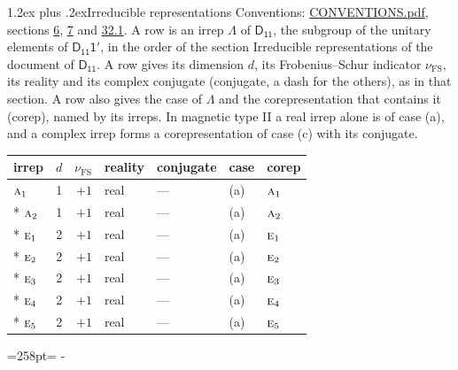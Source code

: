 \documentclass[10pt,a4paper]{article}
\makeatletter
\renewcommand\section{\@startsection{section}{1}{\z@}{-3ex plus -1ex minus -.2ex}%
  {1.2ex plus .2ex}{\normalfont\large\sffamily\bfseries\color{parttitle}}}
\newcommand{\needspace}[1]{\par\penalty-100\begingroup\dimen0=#1\relax\dimen2=\pagegoal
  \advance\dimen2-\pagetotal\ifdim\dimen0>\dimen2\relax\ifdim\dimen2>0pt\vfil\break\fi\fi
  \endgroup}
\numberwithin{equation}{section}
\newcommand{\grp}[1]{\mathsf{#1}}
\newcommand{\irr}[1]{\text{\normalfont\scshape #1}}
\newcommand{\fsind}{\nu_{\mathrm{FS}}}
\makeatother
\begin{document}
\section{Irreducible representations}\label{s:irreps}
Conventions: \href{../../CONVENTIONS.pdf}{CONVENTIONS.pdf}, sections \href{../../../rotation/CONVENTIONS.pdf\#conv.6}{6}, \href{../../../rotation/CONVENTIONS.pdf\#conv.7}{7} and \href{../../CONVENTIONS.pdf\#conv.32.1}{32.1}.
\leavevmode\label{n:irrep.Delta}A row is an irrep $\Lambda$ of $\grp{D_{11}}$, the subgroup of the unitary elements of $\grp{D_{11}1'}$, in the order of the section Irreducible representations of the document of \href{../../../rotation/data/pdf/D11.pdf}{$\grp{D_{11}}$}. \label{n:index.dimension}\label{n:index.frobenius}\label{n:head.irrep}\label{n:head.reality}\label{n:head.conjugate}A row gives its dimension $d$, its Frobenius--Schur indicator $\fsind$, its reality and its complex conjugate (conjugate, a dash for the others), as in that section. \label{n:head.case.corep}\label{n:head.corep}A row also gives the case of $\Lambda$ and the corepresentation that contains it (corep), named by its irreps. In magnetic type II a real irrep alone is of case (a), and a complex irrep forms a corepresentation of case (c) with its conjugate.
\setlength{\emergencystretch}{2em}\par\setlength{\emergencystretch}{0pt}
{\small\renewcommand{\arraystretch}{1.25}\setlength{\tabcolsep}{4pt}\begin{longtable}{@{}lrrllll@{}}\toprule
irrep & $d$ & $\fsind$ & reality & conjugate & case & corep\\\midrule\endhead
\bottomrule\endfoot\endlastfoot
$\irr{a}_{1}$ & 1 & $+1$ & real & --- & (a) & $\irr{a}_{1}$\\*
$\irr{a}_{2}$ & 1 & $+1$ & real & --- & (a) & $\irr{a}_{2}$\\*
$\irr{e}_{1}$ & 2 & $+1$ & real & --- & (a) & $\irr{e}_{1}$\\*
$\irr{e}_{2}$ & 2 & $+1$ & real & --- & (a) & $\irr{e}_{2}$\\*
$\irr{e}_{3}$ & 2 & $+1$ & real & --- & (a) & $\irr{e}_{3}$\\*
$\irr{e}_{4}$ & 2 & $+1$ & real & --- & (a) & $\irr{e}_{4}$\\*
$\irr{e}_{5}$ & 2 & $+1$ & real & --- & (a) & $\irr{e}_{5}$\\
\bottomrule\end{longtable}}
\needspace{258pt}
\end{document}
